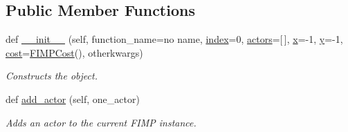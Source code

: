 \subsection*{Public Member Functions}
\begin{DoxyCompactItemize}
\item 
def \hyperlink{classsylva_1_1base_1_1fimp_1_1_f_i_m_p_instance_ad4c68c73febfe4607ff8b0cf583628e0}{\+\_\+\+\_\+init\+\_\+\+\_\+} (self, function\+\_\+name=\textquotesingle{}no name\textquotesingle{}, \hyperlink{classsylva_1_1base_1_1fimp_1_1_f_i_m_p_instance_af01c88ccee9642af4e8b488c6c574fad}{index}=0, \hyperlink{classsylva_1_1base_1_1fimp_1_1_f_i_m_p_instance_add403074726c5a6637a9ea292d12811c}{actors}=\mbox{[}$\,$\mbox{]}, \hyperlink{classsylva_1_1base_1_1fimp_1_1_f_i_m_p_instance_aeb9f8a37a01046643a2c4e9fefae982d}{x}=-\/1, \hyperlink{classsylva_1_1base_1_1fimp_1_1_f_i_m_p_instance_aeca18b6f2bd24ee58b428a2f7fc90d2f}{y}=-\/1, \hyperlink{classsylva_1_1base_1_1fimp_1_1_f_i_m_p_instance_abb77c89ca6b5831cc36d8cc6c25feeff}{cost}=\hyperlink{classsylva_1_1base_1_1fimp_1_1_f_i_m_p_cost}{F\+I\+M\+P\+Cost}(), otherkwargs)
\begin{DoxyCompactList}\small\item\em Constructs the object. \end{DoxyCompactList}\item 
def \hyperlink{classsylva_1_1base_1_1fimp_1_1_f_i_m_p_instance_ac20e7fe05ac4f1bfacf020a57150b0ee}{add\+\_\+actor} (self, one\+\_\+actor)
\begin{DoxyCompactList}\small\item\em Adds an actor to the current F\+I\+MP instance. \end{DoxyCompactList}\end{DoxyCompactItemize}
